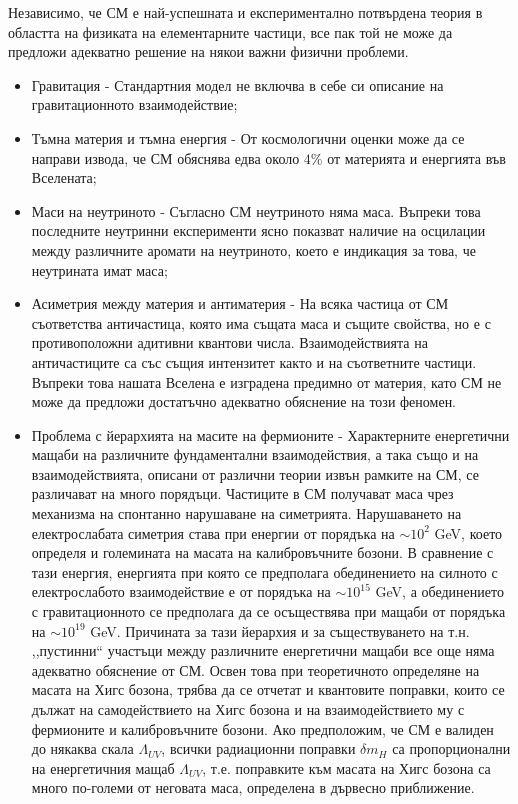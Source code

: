 \par Независимо, че СМ е най-успешната и експериментално потвърдена теория в областта на физиката на елементарните частици, все пак той не може да предложи адекватно решение на някои важни физични проблеми.
\begin{itemize}
\item Гравитация - Стандартния модел не включва в себе си описание на гравитационното взаимодействие;
\item Тъмна материя и тъмна енергия - От космологични оценки може да се направи извода, че СМ обяснява едва около $4\%$ от материята и енергията във Вселената;
\item Маси на неутриното - Съгласно СМ неутриното няма маса. Въпреки това последните неутринни експерименти ясно показват наличие на осцилации между различните аромати на неутриното, което е индикация за това, че неутрината имат маса;
\item Асиметрия между материя и антиматерия - На всяка частица от СМ съответства античастица, която има същата маса и същите свойства, но е с противоположни адитивни квантови числа. Взаимодействията на античастиците са със същия интензитет както и на съответните частици. Въпреки това нашата Вселена е изградена предимно от материя, като СМ не може да предложи достатъчно адекватно обяснение на този феномен.
\item Проблема с йерархията на масите на фермионите - Характерните енергетични мащаби на различните фундаментални взаимодействия, а така също и на взаимодействията, описани от различни теории извън рамките на СМ, се различават на много порядъци. Частиците в СМ получават маса чрез механизма на спонтанно нарушаване на симетрията. Нарушаването на електрослабата симетрия става при енергии от порядъка на $\sim 10^2$ GeV, което определя и големината на масата на калибровъчните бозони. В сравнение с тази енергия, енергията при която се предполага обединението на силното с електрослабото взаимодействие е от порядъка на $\sim 10^{15}$ GeV, а обединението с гравитационното се предполага да се осъществява при мащаби от порядъка на  $\sim 10^{19}$ GeV. Причината за тази йерархия и за съществуването на т.н. ,,пустинни`` участъци между различните енергетични мащаби все още няма адекватно обяснение от СМ. Освен това при теоретичното определяне на масата на Хигс бозона, трябва да се отчетат и квантовите поправки, които се дължат на самодействието на Хигс бозона и на взаимодействието му с фермионите и калибровъчните бозони. Ако предположим, че СМ е валиден до някаква скала $\Lambda_{UV}$, всички радиационни поправки $\delta m_H$ са пропорционални на енергетичния мащаб $\Lambda_{UV}$, т.е. поправките към масата на Хигс бозона са много по-големи от неговата маса, определена в дървесно приближение.

\end{itemize}
